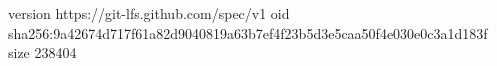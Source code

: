 version https://git-lfs.github.com/spec/v1
oid sha256:9a42674d717f61a82d9040819a63b7ef4f23b5d3e5caa50f4e030e0c3a1d183f
size 238404
